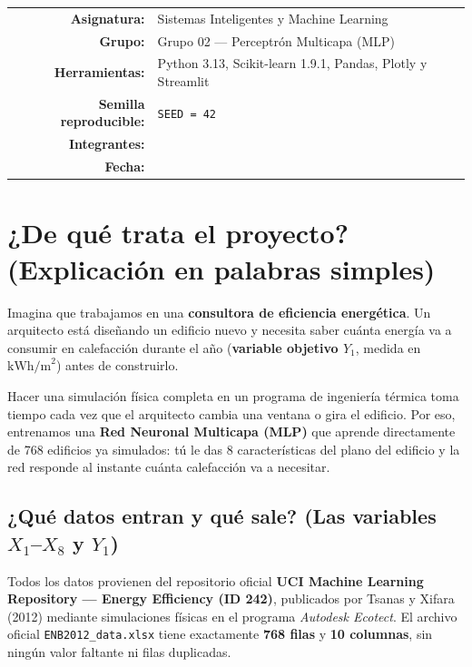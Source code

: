 \documentclass[11pt,a4paper]{article}
\begin{document}
\begin{titlepage}
    \vfill
    \begin{tabular}{rl}
        \textbf{Asignatura:} & Sistemas Inteligentes y Machine Learning \\
        \textbf{Grupo:} & Grupo 02 — Perceptrón Multicapa (MLP) \\
        \textbf{Herramientas:} & Python 3.13, Scikit-learn 1.9.1, Pandas, Plotly y Streamlit \\
        \textbf{Semilla reproducible:} & \texttt{SEED = 42} \\
        \textbf{Integrantes:} & \underline{\hspace{6.8cm}} \\
        \textbf{Fecha:} & \underline{\hspace{6.8cm}}
    \end{tabular}
    \vspace*{0.8cm}
\end{titlepage}

\tableofcontents
\newpage

\section{¿De qué trata el proyecto? (Explicación en palabras simples)}

Imagina que trabajamos en una \textbf{consultora de eficiencia energética}. Un arquitecto está diseñando un edificio nuevo y necesita saber cuánta energía va a consumir en calefacción durante el año (\textbf{variable objetivo $Y_1$}, medida en $\text{kWh/m}^2$) antes de construirlo.

Hacer una simulación física completa en un programa de ingeniería térmica toma tiempo cada vez que el arquitecto cambia una ventana o gira el edificio. Por eso, entrenamos una \textbf{Red Neuronal Multicapa (MLP)} que aprende directamente de 768 edificios ya simulados: tú le das 8 características del plano del edificio y la red responde al instante cuánta calefacción va a necesitar.

\subsection{¿Qué datos entran y qué sale? (Las variables $X_1$--$X_8$ y $Y_1$)}
Todos los datos provienen del repositorio oficial \textbf{UCI Machine Learning Repository — Energy Efficiency (ID 242)}, publicados por Tsanas y Xifara (2012) mediante simulaciones físicas en el programa \textit{Autodesk Ecotect}. El archivo oficial \texttt{ENB2012\_data.xlsx} tiene exactamente \textbf{768 filas} y \textbf{10 columnas}, sin ningún valor faltante ni filas duplicadas.
\end{document}
